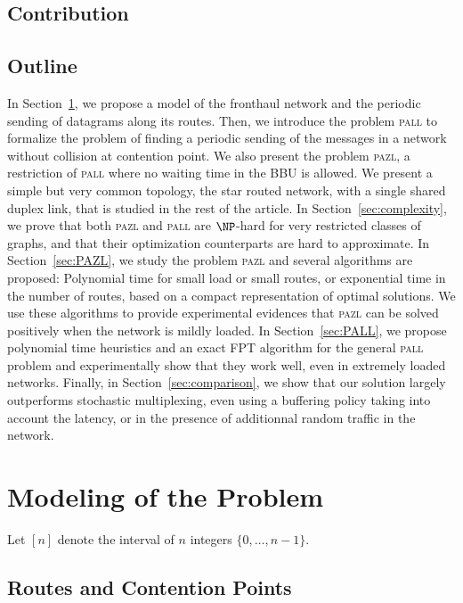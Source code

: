 \documentclass[a4paper,10pt]{journal}
\newcommand\pazl{\textsc{pazl}\xspace}
\newcommand\pall{\textsc{pall}\xspace}
\begin{document}
\subsection*{Contribution}

\subsection*{Outline}

 In Section~\ref{sec:def}, we propose a model of the fronthaul network and the periodic sending of datagrams along its routes. Then, we introduce the problem \pall to formalize the problem of finding a periodic sending of the messages in a network without collision at contention point. We also present the problem \pazl, a restriction of \pall where no waiting time in the BBU is allowed. We present a simple but very common topology, the star routed network, with a single shared duplex link, that is studied in the rest of the article.  In Section~\ref{sec:complexity}, we prove that both \pazl and \pall are $\NP$-hard for very restricted classes of graphs, and that their optimization counterparts are hard to approximate. 
 In Section~\ref{sec:PAZL}, we study the problem \pazl and several algorithms are proposed: Polynomial time for small load or small routes, or exponential time in the number of routes, based on a compact representation of optimal solutions. We use these algorithms to provide experimental evidences that \pazl can be solved positively when the network is mildly loaded. In Section~\ref{sec:PALL}, we propose polynomial time heuristics and an exact FPT algorithm for the general \pall problem and experimentally show that they work well, even in extremely loaded networks. 
Finally, in Section~\ref{sec:comparison}, we show that our solution largely outperforms stochastic multiplexing, even using a buffering policy taking into account the latency, or in the presence of additionnal random traffic in the network.



\section{Modeling of the Problem}\label{sec:def}

Let $[n]$ denote the interval of $n$ integers $\{0,\dots,n-1\}$.


	\subsection{Routes and Contention Points}
\end{document}
